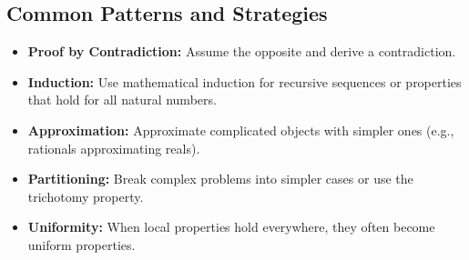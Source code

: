 \subsection*{Common Patterns and Strategies}

\begin{itemize}
\item \textbf{Proof by Contradiction:} Assume the opposite and derive a contradiction.

\item \textbf{Induction:} Use mathematical induction for recursive sequences or properties that hold for all natural numbers.

\item \textbf{Approximation:} Approximate complicated objects with simpler ones (e.g., rationals approximating reals).

\item \textbf{Partitioning:} Break complex problems into simpler cases or use the trichotomy property.

\item \textbf{Uniformity:} When local properties hold everywhere, they often become uniform properties.
\end{itemize}
